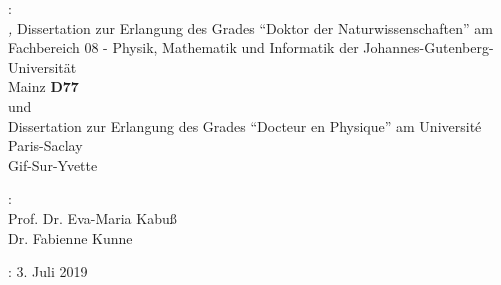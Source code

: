 
\thispagestyle{empty}

\hfill

\vfill

\noindent\myName: \\
\textit{\myTitle,}
Dissertation zur Erlangung des Grades “Doktor der Naturwissenschaften” am Fachbereich 08 - Physik, Mathematik und Informatik der Johannes-Gutenberg-Universität \\
Mainz \textbf{D77} \\
und \\
Dissertation zur Erlangung des Grades “Docteur en Physique” am Université Paris-Saclay \\
Gif-Sur-Yvette \\
\myTime

\vspace{5mm}

\noindent{}: \\
Prof. Dr. Eva-Maria Kabuß \\
Dr. Fabienne Kunne

\vspace{5mm}

\noindent{}: 3. Juli 2019







